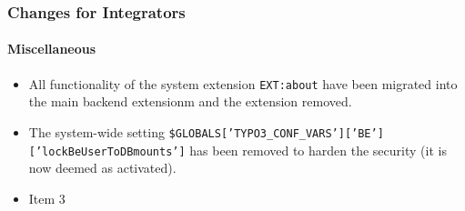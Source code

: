 %

\begin{frame}[fragile]
	\frametitle{Changes for Integrators}
	\framesubtitle{Miscellaneous}

	\begin{itemize}
		\item All functionality of the system extension \texttt{EXT:about}
			have been migrated into the main backend extensionm and the
			extension removed.
		\item The system-wide setting
			\small\texttt{\$GLOBALS['TYPO3\_CONF\_VARS']['BE']['lockBeUserToDBmounts']}\normalsize
			has been removed to harden the security (it is now deemed as activated).
		\item Item 3
	\end{itemize}

\end{frame}

